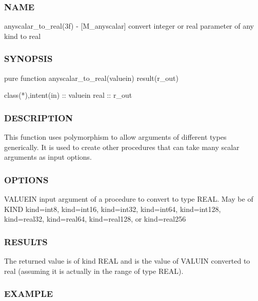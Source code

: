 \subsubsection*{N\+A\+ME}

anyscalar\+\_\+to\+\_\+real(3f) -\/ \mbox{[}M\+\_\+anyscalar\mbox{]} convert integer or real parameter of any kind to real 

\subsubsection*{S\+Y\+N\+O\+P\+S\+IS}

\begin{DoxyVerb}pure function anyscalar_to_real(valuein) result(r_out)

 class(*),intent(in)  :: valuein
 real                 :: r_out
\end{DoxyVerb}


\subsubsection*{D\+E\+S\+C\+R\+I\+P\+T\+I\+ON}

\begin{DoxyVerb}This function uses polymorphism to allow arguments of different types
generically. It is used to create other procedures that can take
many scalar arguments as input options.
\end{DoxyVerb}


\subsubsection*{O\+P\+T\+I\+O\+NS}

\begin{DoxyVerb}VALUEIN  input argument of a procedure to convert to type REAL.
         May be of KIND kind=int8, kind=int16, kind=int32, kind=int64,
         kind=int128, kind=real32, kind=real64, kind=real128,
         or kind=real256
\end{DoxyVerb}
 \subsubsection*{R\+E\+S\+U\+L\+TS}

The returned value is of kind R\+E\+AL and is the value of V\+A\+L\+U\+IN converted to real (assuming it is actually in the range of type R\+E\+AL).

\subsubsection*{E\+X\+A\+M\+P\+LE}

